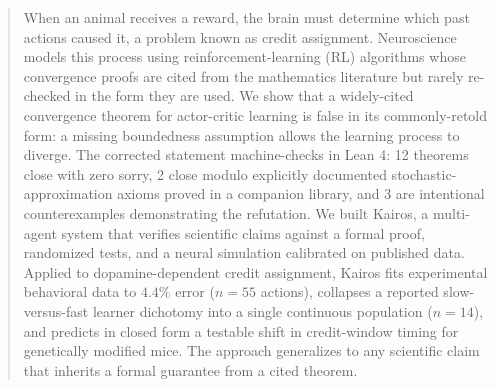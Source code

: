 \begin{abstract}
When an animal receives a reward, the brain must determine which
past actions caused it, a problem known as credit assignment.
Neuroscience models this process using reinforcement-learning (RL)
algorithms whose convergence proofs are cited from the mathematics
literature but rarely re-checked in the form they are used. We
show that a widely-cited convergence theorem for actor-critic
learning is false in its commonly-retold form: a missing
boundedness assumption allows the learning process to diverge.
The corrected statement machine-checks in Lean 4: 12 theorems
close with zero sorry, 2 close modulo explicitly documented
stochastic-approximation axioms proved in a companion library,
and 3 are intentional counterexamples demonstrating the refutation. We built Kairos, a multi-agent system that verifies
scientific claims against a formal proof, randomized tests, and a
neural simulation calibrated on published data. Applied to
dopamine-dependent credit assignment, Kairos fits experimental
behavioral data to $4.4\%$ error ($n = 55$ actions), collapses a
reported slow-versus-fast learner dichotomy into a single
continuous population ($n = 14$), and predicts in closed form a
testable shift in credit-window timing for genetically modified
mice. The approach generalizes to any scientific claim that
inherits a formal guarantee from a cited theorem.
\end{abstract}
